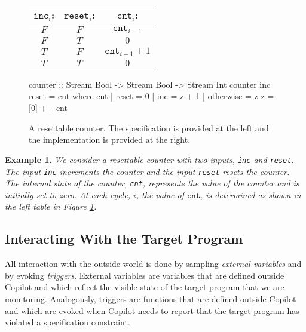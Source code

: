 \documentclass[]{article}
\theoremstyle{example}
\newtheorem{example}{Example}
\begin{document}
\begin{figure}
\begin{minipage}{0.4\linewidth}
\begin{tabular}{c|c||c}
$\mathtt{inc}_i$: & $\mathtt{reset}_i$: & $\mathtt{cnt}_i$: \\
\hline
$F$ & $F$ & $\mathtt{cnt}_{i-1}$ \\
\hline
$F$ & $T$ & $0$ \\
\hline
$T$ & $F$ & $\mathtt{cnt}_{i-1} + 1$ \\
\hline
$T$ & $T$ & $0$
\end{tabular}
\end{minipage}
\hspace{1cm}
\begin{minipage}{0.6\linewidth}
\begin{code}
counter :: Stream Bool -> Stream Bool 
        -> Stream Int
counter inc reset = cnt
  where
    cnt | reset     = 0
        | inc       = z + 1
        | otherwise = z
    z = [0] ++ cnt
\end{code}
\end{minipage}
\caption{A resettable counter. The specification is provided at the left and the
implementation is provided at the right.
}
\label{fig:counter}
\end{figure}

\begin{example}
We consider a resettable counter with two inputs, {\tt inc} and {\tt reset}.
The input {\tt inc} increments the counter and the input {\tt reset} resets the
counter. The internal state of the counter, {\tt cnt}, represents the value of the
counter and is initially set to zero. At each cycle, $i$, the value of
$\mathtt{cnt}_i$ is determined as shown in the left table in Figure
\ref{fig:counter}.
\end{example}


\subsection{Interacting With the Target Program}
\label{sec:interacting}
All interaction with the outside world is done by sampling \emph{external
variables} and by evoking \emph{triggers}.
External variables are variables that are defined outside Copilot and which
reflect the visible state of the target program that we are monitoring.
Analogously, triggers are functions that are defined outside Copilot and which
are evoked when Copilot needs to report that the target program has violated a
specification constraint.
\end{document}
